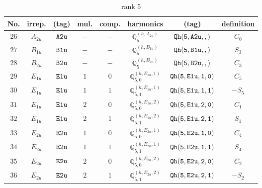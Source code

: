 \documentclass[fleqn,8pt]{jsarticle}
\begin{document}
\begin{table}[ht!]
\begin{center}
\caption{rank 5}
\renewcommand{\arraystretch}{1.3}
\begin{tabular}{cccccccc} \hline \hline
No. & irrep. & (tag) & mul. & comp. & harmonics & (tag) & definition \\ \hline
$ 26 $ & $ A_{2u} $ & $ {\tt A2u} $ & $ - $ & $ - $ & $ \mathbb{Q}_{5}^{(h,A_{2u})} $ & $ {\tt Qh(5,A2u,,)} $ & $ C_{0} $ \\
$ 27 $ & $ B_{1u} $ & $ {\tt B1u} $ & $ - $ & $ - $ & $ \mathbb{Q}_{5}^{(h,B_{1u})} $ & $ {\tt Qh(5,B1u,,)} $ & $ S_{3} $ \\
$ 28 $ & $ B_{2u} $ & $ {\tt B2u} $ & $ - $ & $ - $ & $ \mathbb{Q}_{5}^{(h,B_{2u})} $ & $ {\tt Qh(5,B2u,,)} $ & $ C_{3} $ \\
$ 29 $ & $ E_{1u} $ & $ {\tt E1u} $ & $ 1 $ & $ 0 $ & $ \mathbb{Q}_{5,0}^{(h,E_{1u},1)} $ & $ {\tt Qh(5,E1u,1,0)} $ & $ C_{5} $ \\
$ 30 $ & $ E_{1u} $ & $ {\tt E1u} $ & $ 1 $ & $ 1 $ & $ \mathbb{Q}_{5,1}^{(h,E_{1u},1)} $ & $ {\tt Qh(5,E1u,1,1)} $ & $ - S_{5} $ \\
$ 31 $ & $ E_{1u} $ & $ {\tt E1u} $ & $ 2 $ & $ 0 $ & $ \mathbb{Q}_{5,0}^{(h,E_{1u},2)} $ & $ {\tt Qh(5,E1u,2,0)} $ & $ C_{1} $ \\
$ 32 $ & $ E_{1u} $ & $ {\tt E1u} $ & $ 2 $ & $ 1 $ & $ \mathbb{Q}_{5,1}^{(h,E_{1u},2)} $ & $ {\tt Qh(5,E1u,2,1)} $ & $ S_{1} $ \\
$ 33 $ & $ E_{2u} $ & $ {\tt E2u} $ & $ 1 $ & $ 0 $ & $ \mathbb{Q}_{5,0}^{(h,E_{2u},1)} $ & $ {\tt Qh(5,E2u,1,0)} $ & $ C_{4} $ \\
$ 34 $ & $ E_{2u} $ & $ {\tt E2u} $ & $ 1 $ & $ 1 $ & $ \mathbb{Q}_{5,1}^{(h,E_{2u},1)} $ & $ {\tt Qh(5,E2u,1,1)} $ & $ S_{4} $ \\
$ 35 $ & $ E_{2u} $ & $ {\tt E2u} $ & $ 2 $ & $ 0 $ & $ \mathbb{Q}_{5,0}^{(h,E_{2u},2)} $ & $ {\tt Qh(5,E2u,2,0)} $ & $ C_{2} $ \\
$ 36 $ & $ E_{2u} $ & $ {\tt E2u} $ & $ 2 $ & $ 1 $ & $ \mathbb{Q}_{5,1}^{(h,E_{2u},2)} $ & $ {\tt Qh(5,E2u,2,1)} $ & $ - S_{2} $ \\
 \hline \hline
\end{tabular}
\end{center}
\end{table}
\end{document}
